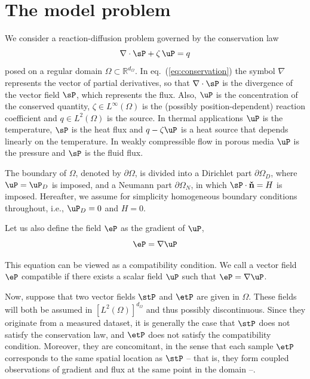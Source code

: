 \section{The model problem}

We consider a reaction-diffusion problem governed by the conservation law
\begin{equation}
	\nabla \cdot \sP + \zeta\,\uP = q
	\label{eq:conservation}
\end{equation}
posed on a regular domain $\Omega \subset \mathbb{R}^{d_{\Omega}}$. In eq.~(\ref{eq:conservation}) the symbol $\nabla$ represents the vector of partial derivatives, so that $\nabla \cdot \sP$ is the divergence of the vector field $\sP$, which represents the flux. Also, $\uP$ is the concentration of the conserved quantity, $\zeta \in L^{\infty}(\Omega)$ is the (possibly position-dependent) reaction coefficient and $q\in L^2(\Omega)$ is the source. In thermal applications $\uP$ is the temperature, $\sP$ is the heat flux and $q-\zeta \uP$ is a heat source that depends linearly on the temperature. In weakly compressible flow in porous media $\uP$ is the pressure and $\sP$ is the fluid flux.

The boundary of $\Omega$, denoted by $\partial \Omega$, is divided into a Dirichlet part $\partial \Omega_D$, where $\uP=\uP_D$ is imposed, and a Neumann part $\partial\Omega_N$, in which $\sP \cdot \mathbf{\check{n}}=H$ is imposed. Hereafter, we assume for simplicity homogeneous boundary conditions throughout, i.e., $\uP_D = 0$ and $H = 0$.

Let us also define the field $\eP$ as the gradient of $\uP$,
\begin{equation}
	\eP = \nabla \uP
\label{eq:compatibility}
\end{equation}

This equation can be viewed as a compatibility condition. We call a vector field $\eP$ compatible if there exists a scalar field $\uP$ such that $\eP=\nabla \uP$.

Now, suppose that two vector fields $\stP$ and $\etP$ are given in $\Omega$. These fields will both be assumed in $\left[L^2(\Omega)\right]^{d_{\Omega}}$ and thus possibly discontinuous. Since they originate from a measured dataset, it is generally the case that $\stP$ does not satisfy the conservation law, and $\etP$ does not satisfy the compatibility condition. Moreover, they are concomitant, in the sense that each sample $\etP$ corresponds to the same spatial location as $\stP$ -- that is, they form coupled observations of gradient and flux at the same point in the domain --.

